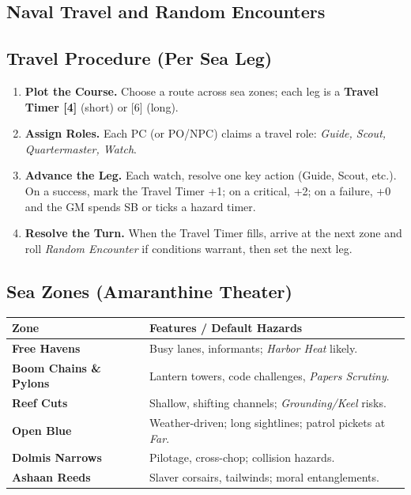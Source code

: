 \documentclass[11pt,oneside]{book}
\begin{document}
\begin{itemize}
\section{Naval Travel and Random Encounters}

\subsection*{Travel Procedure (Per Sea Leg)}
\begin{enumerate}[leftmargin=*,itemsep=2pt]
  \item \textbf{Plot the Course.} Choose a route across sea zones; each leg is a \textbf{Travel Timer [4]} (short) or [6] (long).
  \item \textbf{Assign Roles.} Each PC (or PO/NPC) claims a travel role: \emph{Guide, Scout, Quartermaster, Watch}.
  \item \textbf{Advance the Leg.} Each watch, resolve one key action (Guide, Scout, etc.). On a success, mark the Travel Timer +1; on a critical, +2; on a failure, +0 and the GM spends SB or ticks a hazard timer.
  \item \textbf{Resolve the Turn.} When the Travel Timer fills, arrive at the next zone and roll \emph{Random Encounter} if conditions warrant, then set the next leg.
\end{enumerate}

\subsection*{Sea Zones (Amaranthine Theater)}
\begin{tabularx}{\linewidth}{@{}p{3.3cm} X@{}}
\toprule
\textbf{Zone} & \textbf{Features / Default Hazards}\\
\midrule
\textbf{Free Havens} & Busy lanes, informants; \emph{Harbor Heat} likely.\\
\textbf{Boom Chains \& Pylons} & Lantern towers, code challenges, \emph{Papers Scrutiny}.\\
\textbf{Reef Cuts} & Shallow, shifting channels; \emph{Grounding/Keel} risks.\\
\textbf{Open Blue} & Weather-driven; long sightlines; patrol pickets at \emph{Far}.\\
\textbf{Dolmis Narrows} & Pilotage, cross-chop; collision hazards.\\
\textbf{Ashaan Reeds} & Slaver corsairs, tailwinds; moral entanglements.\\
\bottomrule
\end{tabularx}


\end{itemize}
\end{document}
